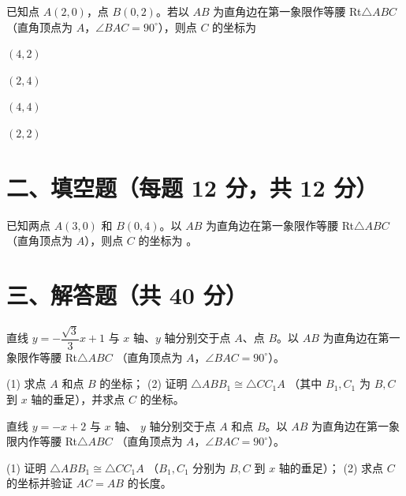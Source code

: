\documentclass{exam-zh}
\newcommand{\answerarea}[1][40mm]{%
  \vspace{2mm}%
  \begin{tcolorbox}[
    enhanced, breakable,
    colback=white,
    colframe=white,
    boxrule=0pt,
    height=#1,
    valign=top,
    bottom=0mm,
    after skip=0mm,
  ]
  \end{tcolorbox}%
}
\begin{document}
\begin{question}[points=12]
  已知点 $A(2, 0)$，点 $B(0, 2)$。若以 $AB$ 为直角边在第一象限作等腰 Rt$\triangle ABC$ （直角顶点为 $A$，$\angle BAC = 90^\circ$），则点 $C$ 的坐标为
  \begin{choices}
    \item $(4, 2)$
    \item $(2, 4)$
    \item $(4, 4)$
    \item $(2, 2)$
  \end{choices}
\end{question}


\section*{二、填空题（每题 12 分，共 12 分）}


\begin{question}[points=12]
  已知两点 $A(3, 0)$ 和 $B(0, 4)$。以 $AB$ 为直角边在第一象限作等腰 Rt$\triangle ABC$ （直角顶点为 $A$），则点 $C$ 的坐标为 \fillin。
\end{question}


\section*{三、解答题（共 40 分）}


\begin{problem}[points=20]
  直线 $y = -\dfrac{\sqrt{3}}{3}x + 1$ 与 $x$ 轴、$y$ 轴分别交于点 $A$、点 $B$。以 $AB$ 为直角边在第一象限作等腰 Rt$\triangle ABC$ （直角顶点为 $A$，$\angle BAC = 90^\circ$）。

(1) 求点 $A$ 和点 $B$ 的坐标；
(2) 证明 $\triangle ABB_1 \cong \triangle CC_1A$ （其中 $B_1, C_1$ 为 $B, C$ 到 $x$ 轴的垂足），并求点 $C$ 的坐标。
  \answerarea[60mm]
\end{problem}



\begin{problem}[points=20]
  直线 $y = -x + 2$ 与 $x$ 轴、 $y$ 轴分别交于点 $A$ 和点 $B$。以 $AB$ 为直角边在第一象限内作等腰 Rt$\triangle ABC$ （直角顶点为 $A$，$\angle BAC = 90^\circ$）。

(1) 证明 $\triangle ABB_1 \cong \triangle CC_1A$ （$B_1, C_1$ 分别为 $B, C$ 到 $x$ 轴的垂足）；
(2) 求点 $C$ 的坐标并验证 $AC = AB$ 的长度。
  \answerarea[55mm]
\end{problem}
\end{document}
